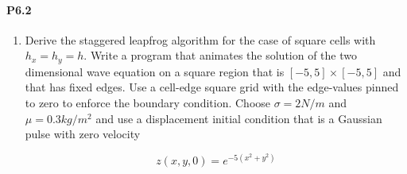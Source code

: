 \paragraph*{P6.2} 

\begin{enumerate}[label=(\alph*)]
	\item Derive the staggered leapfrog algorithm for the case of square cells
with $h_x = h_y = h$. Write a program that animates the solution of the
two dimensional wave equation on a square region that is $[−5,5] ×
[−5,5]$ and that has fixed edges. Use a cell-edge square grid with
the edge-values pinned to zero to enforce the boundary condition.
Choose $\sigma = 2 N/m$ and $ \mu = 0.3 kg/m^2$
and use a displacement initial
condition that is a Gaussian pulse with zero velocity

\begin{equation}\label{eq:67}
z(x,y,0) = e^{-5(x^2+y^2)}
\end{equation}


\end{enumerate}
